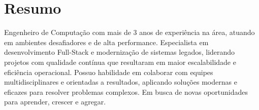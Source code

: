 \section{Resumo}
	Engenheiro de Computação com mais de 3 anos de experiência na área, atuando em ambientes desafiadores e de alta performance. Especialista em desenvolvimento Full-Stack e modernização de sistemas legados, liderando projetos com qualidade contínua que resultaram em maior escalabilidade e eficiência operacional. Possuo habilidade em colaborar com equipes multidisciplinares e orientadas a resultados, aplicando soluções modernas e eficazes para resolver problemas complexos. Em busca de novas oportunidades para aprender, crescer e agregar.